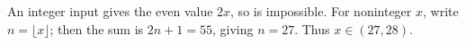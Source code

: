 An integer input gives the even value $2x$, so is impossible. For noninteger $x$, write $n=\lfloor x\rfloor$; then the sum is $2n+1=55$, giving $n=27$. Thus $\boxed{x\in(27,28)}$.
